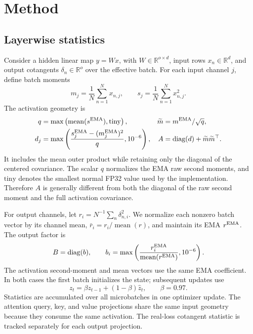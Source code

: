 \documentclass[10pt]{article}
\newcommand{\R}{\mathbb{R}}
\begin{document}
\section{Method}
\subsection{Layerwise statistics}
Consider a hidden linear map $y=W x$, with $W\in\R^{o\times d}$, input rows $x_n\in\R^d$, and output cotangents $\delta_n\in\R^o$ over the effective batch. For each input channel $j$, define batch moments
\begin{equation}
 m_j=\frac1N\sum_{n=1}^N x_{n,j},\qquad
 s_j=\frac1N\sum_{n=1}^N x_{n,j}^2.
\end{equation}
The activation geometry is
\begin{equation}\label{eq:A}
\begin{aligned}
 q&=\max\left(\operatorname{mean}(s^{\rm EMA}),\mathrm{tiny}\right),
 &\widetilde m&=m^{\rm EMA}/\sqrt q,\\
 d_j&=\max\left(\frac{s_j^{\rm EMA}-(m_j^{\rm EMA})^2}{q},10^{-6}\right),
 &A&=\operatorname{diag}(d)+\widetilde m\widetilde m^\top.
\end{aligned}
\end{equation}
It includes the mean outer product while retaining only the diagonal of the centered covariance. The scalar $q$ normalizes the EMA raw second moments, and $\mathrm{tiny}$ denotes the smallest normal FP32 value used by the implementation. Therefore $A$ is generally different from both the diagonal of the raw second moment and the full activation covariance.

For output channels, let $r_i=N^{-1}\sum_n\delta_{n,i}^2$. We normalize each nonzero batch vector by its channel mean, $\bar r_i=r_i/\operatorname{mean}(r)$, and maintain its EMA $r^{\rm EMA}$. The output factor is
\begin{equation}
 B=\operatorname{diag}(b),\qquad
 b_i=\max\left(\frac{r_i^{\rm EMA}}{\operatorname{mean}(r^{\rm EMA})},10^{-6}\right).
\end{equation}
The activation second-moment and mean vectors use the same EMA coefficient. In both cases the first batch initializes the state; subsequent updates use
\begin{equation}\label{eq:ema}
 z_t=\beta z_{t-1}+(1-\beta)\widehat z_t,\qquad \beta=0.97.
\end{equation}
Statistics are accumulated over all microbatches in one optimizer update. The attention query, key, and value projections share the same input geometry because they consume the same activation. The real-loss cotangent statistic is tracked separately for each output projection.
\end{document}
